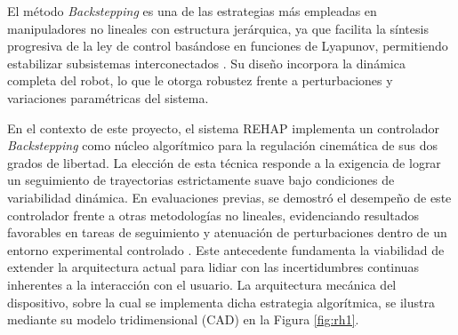 \documentclass[a4paper,12pt]{article}
\begin{document}

El método \textit{Backstepping} es una de las estrategias más empleadas en manipuladores no lineales con estructura jerárquica, ya que facilita la síntesis progresiva de la ley de control basándose en funciones de Lyapunov, permitiendo estabilizar subsistemas interconectados \citep{khalil2002nonlinear}. Su diseño incorpora la dinámica completa del robot, lo que le otorga robustez frente a perturbaciones y variaciones paramétricas del sistema.

En el contexto de este proyecto, el sistema REHAP implementa un controlador \textit{Backstepping} como núcleo algorítmico para la regulación cinemática de sus dos grados de libertad. La elección de esta técnica responde a la exigencia de lograr un seguimiento de trayectorias estrictamente suave bajo condiciones de variabilidad dinámica. En evaluaciones previas, se demostró el desempeño de este controlador frente a otras metodologías no lineales, evidenciando resultados favorables en tareas de seguimiento y atenuación de perturbaciones dentro de un entorno experimental controlado \citep{reyes2025comparative}. Este antecedente fundamenta la viabilidad de extender la arquitectura actual para lidiar con las incertidumbres continuas inherentes a la interacción con el usuario. La arquitectura mecánica del dispositivo, sobre la cual se implementa dicha estrategia algorítmica, se ilustra mediante su modelo tridimensional (CAD) en la Figura \ref{fig:rh1}.
\end{document}
